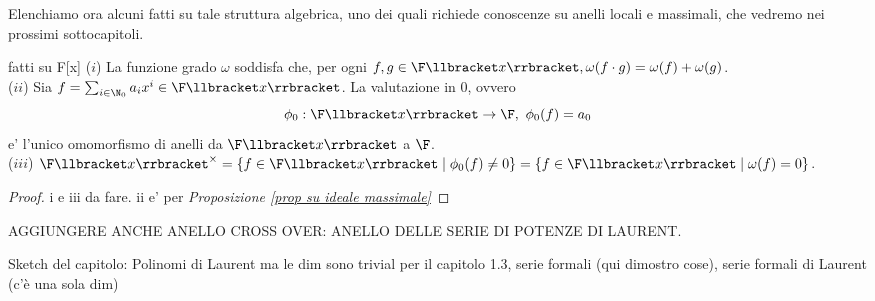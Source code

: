 \noindent Elenchiamo ora alcuni fatti su tale struttura algebrica, uno dei quali richiede conoscenze su anelli locali e massimali, 
che vedremo nei prossimi sottocapitoli.

\begin{lem}[]{fatti su F[x]}
  ($i$) La funzione grado $\omega$ soddisfa che, per ogni $f, g \in \F\llbracket x \rrbracket, \omega(f\cdot g) = \omega(f) + \omega(g)$. \\
  \noindent ($ii$) Sia $f = \sum_{i\in \N_0} a_i x^i \in \F\llbracket x \rrbracket$. La valutazione in 0, ovvero
      \[ \phi_0 : \F\llbracket x \rrbracket \rightarrow \F,\ \phi_0(f) = a_0 \]
    \noindent e' l'unico omomorfismo di anelli da $\F\llbracket x \rrbracket$ a $\F$.\\
  \noindent ($iii$) $\F\llbracket x \rrbracket^{\times} = \{ f \in \F\llbracket x \rrbracket \mid \phi_0(f) \neq 0 \} 
    = \{ f \in \F\llbracket x \rrbracket \mid \omega(f) = 0 \}$.
 
\end{lem}
\begin{proof}
  i e iii da fare. ii e' per \emph{Proposizione \ref{prop su ideale massimale}}
\end{proof}

AGGIUNGERE ANCHE ANELLO CROSS OVER: ANELLO DELLE SERIE DI POTENZE DI LAURENT.


\noindent Sketch del capitolo: Polinomi di Laurent ma le dim sono trivial per il capitolo 1.3, serie formali (qui dimostro cose), 
serie formali di Laurent (c'è una sola dim)

\clearpage